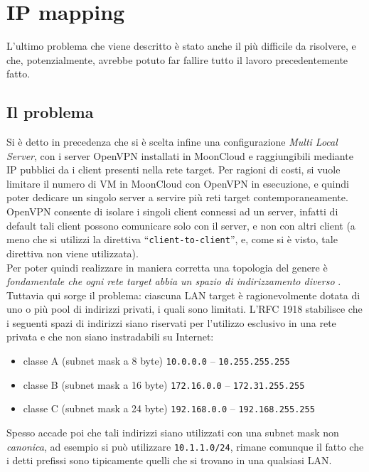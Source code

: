 \section{IP mapping}
L'ultimo problema che viene descritto  è stato anche il
più difficile da risolvere, e che, potenzialmente, avrebbe potuto far fallire
tutto il lavoro precedentemente fatto.

\subsection{Il problema}
Si è detto in precedenza che si è scelta infine una configurazione \textit{Multi Local
Server}, con i server OpenVPN installati in MoonCloud e raggiungibili mediante IP
pubblici da i client presenti nella rete target. Per ragioni di costi, si vuole
limitare il numero di VM in MoonCloud con OpenVPN in esecuzione, e quindi poter
dedicare un singolo server a servire più reti target contemporaneamente. OpenVPN
consente di isolare i singoli client connessi ad un server, infatti di default
tali client possono comunicare solo con il server, e non con altri client (a meno
che si utilizzi la direttiva ``\texttt{client-to-client}'', e, come si è visto,
tale direttiva non viene utilizzata).\\
Per poter quindi realizzare in maniera corretta una topologia del genere è
\textit{fondamentale che ogni rete target abbia un spazio di indirizzamento diverso} \cite{openvpn-lan-to-lan}.
Tuttavia qui sorge il problema: ciascuna LAN target è ragionevolmente dotata
di uno o più pool di indirizzi privati, i quali sono limitati. L'RFC 1918 \cite{RFC1918}
stabilisce che i seguenti spazi di indirizzi siano riservati per l'utilizzo esclusivo
in una rete privata e che non siano instradabili su Internet:
\begin{itemize}
  \item classe A (subnet mask a 8 byte) \texttt{10.0.0.0} -- \texttt{10.255.255.255}
  \item classe B (subnet mask a 16 byte) \texttt{172.16.0.0} -- \texttt{172.31.255.255}
  \item classe C (subnet mask a 24 byte) \texttt{192.168.0.0} -- \texttt{192.168.255.255}
\end{itemize}
Spesso accade poi che tali indirizzi siano utilizzati con una subnet mask non
\textit{canonica}, ad esempio si può utilizzare \texttt{10.1.1.0/24}, rimane
comunque il fatto che i detti prefissi sono tipicamente quelli che si trovano
in una qualsiasi LAN.\\
